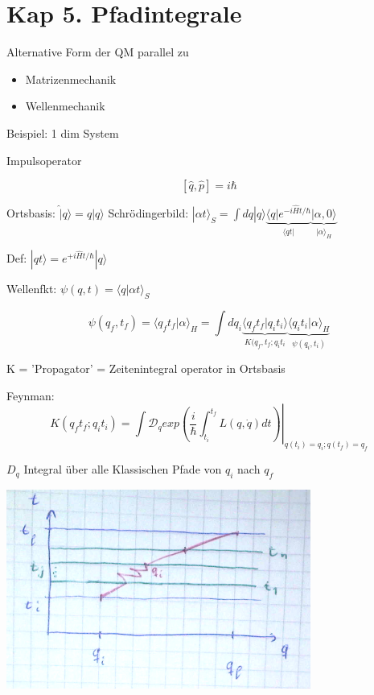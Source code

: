 



\setcounter{chapter}{4}
\chapter*{Kap 5. Pfadintegrale}

Alternative Form der QM parallel zu 

\begin{itemize}
\item Matrizenmechanik
\item Wellenmechanik
\end{itemize}

Beispiel: 1 dim System

Impulsoperator

\[ [\hat q,\hat p]=i\hbar\]

Ortsbasis: \(\hat |q\rangle =q|q\rangle \)
Schrödingerbild: \(|\alpha t\rangle_S =  \int dq|q\rangle \underbrace{\langle q|e^{-i\hat H t/\hbar}}_{\langle qt|} \underbrace{|\alpha,0\rangle}_{|\alpha\rangle_H} \)

Def: \(|qt\rangle = e^{+i\hat H t/\hbar}|q\rangle \)

Wellenfkt: \(\psi(q,t) = \langle q|\alpha t\rangle_S\)

\[\psi(q_f,t_f) = \langle q_f t_f | \alpha\rangle_H = \int dq_i\underbrace{\langle q_f t_f|q_it_i\rangle }_{K(q_f,t_f;q_it_i}\underbrace{\langle q_it_i|\alpha\rangle_H}_{\psi (q_i,t_i)}\]


K = 'Propagator' = Zeitenintegral operator in Ortsbasis

Feynman:
\[ K(q_ft_f; q_it_i) = \left.\int\mathcal D_q exp(\frac{i}{\hbar}\int_{t_i}^{t_f}L(q,\dot q)dt)\right|_{q(t_i) = q_i; q(t_f) = q_f}\]

\(D_q\) Integral über alle Klassischen Pfade von \(q_i\) nach \(q_f\)


\includegraphics[width=0.75\textwidth]{kap05_01.png}


